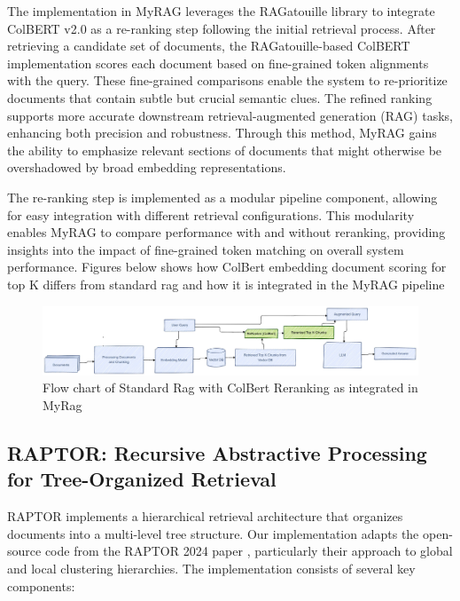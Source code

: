 \documentclass{scrartcl}
\begin{document}
The implementation in MyRAG leverages the RAGatouille library \cite{ragatouille} to integrate ColBERT v2.0 as a re-ranking step following the initial retrieval process. After retrieving a candidate set of documents, the RAGatouille-based ColBERT implementation scores each document based on fine-grained token alignments with the query. These fine-grained comparisons enable the system to re-prioritize documents that contain subtle but crucial semantic clues. The refined ranking supports more accurate downstream retrieval-augmented generation (RAG) tasks, enhancing both precision and robustness. Through this method, MyRAG gains the ability to emphasize relevant sections of documents that might otherwise be overshadowed by broad embedding representations.

The re-ranking step is implemented as a modular pipeline component, allowing for easy integration with different retrieval configurations. This modularity enables MyRAG to compare performance with and without reranking, providing insights into the impact of fine-grained token matching on overall system performance. Figures below shows how ColBert embedding document scoring for top K differs from standard rag and how it is integrated in the MyRAG pipeline



\begin{figure}[H]
	\centering
	\includegraphics[width=\linewidth]{StandardRagWithReRanking.pdf}
	\caption{Flow chart of Standard Rag with ColBert Reranking as integrated in MyRag}
	\label{fig:reranking_rag}
\end{figure}


\subsection{RAPTOR: Recursive Abstractive Processing for Tree-Organized Retrieval}
RAPTOR \cite{wu2021recursively, raptor2024} implements a hierarchical retrieval architecture that organizes documents into a multi-level tree structure. Our implementation adapts the open-source code from the RAPTOR 2024 paper \cite{raptor2024}, particularly their approach to global and local clustering hierarchies. The implementation consists of several key components:
\end{document}
